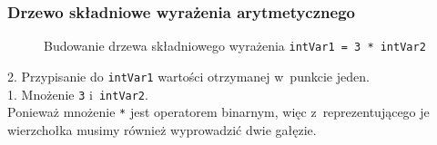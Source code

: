 \documentclass[10pt,t]{beamer}
\begin{document}
\begin{frame}
  \frametitle{Drzewo składniowe wyrażenia arytmetycznego}


  \begin{figure}


    \caption{Budowanie drzewa składniowego wyrażenia
      \texttt{intVar1 = 3 * intVar2}}

    \label{fig:Scheme-of-CPU}

  \end{figure}





  2. Przypisanie do \texttt{intVar1} wartości otrzymanej w~punkcie jeden. \\
  1. Mnożenie \texttt{3} i~\texttt{intVar2}. \\
  Ponieważ mnożenie \texttt{*} jest operatorem binarnym, więc
  z~reprezentującego je wierzchołka musimy również wyprowadzić dwie gałęzie.

\end{frame}
\end{document}
